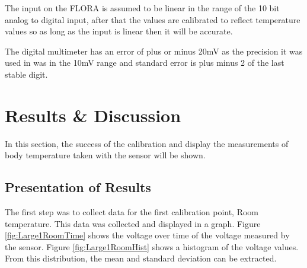 \documentclass[12pt,a4paper]{report}
\begin{document}
        The input on the FLORA is assumed to be linear in the range of the 10 bit analog to digital input, after that the values are calibrated to reflect temperature values so as long as the input is linear then it will be accurate.\par
        
        The digital multimeter has an error of plus or minus 20mV as the precision it was used in was in the 10mV range and standard error is plus minus 2 of the last stable digit.\par
        
        
        
        

\newpage
\section{Results \& Discussion}
In this section, the success of the calibration and display the measurements of body temperature taken with the sensor will be shown.
\subsection{Presentation of Results}

The first step was to collect data for the first calibration point, Room temperature. This data was collected and displayed in a graph. Figure \ref{fig:Large1RoomTime} shows the voltage over time of the voltage measured by the sensor. Figure \ref{fig:Large1RoomHist} shows a histogram of the voltage values. From this distribution, the mean and standard deviation can be extracted.
\end{document}
